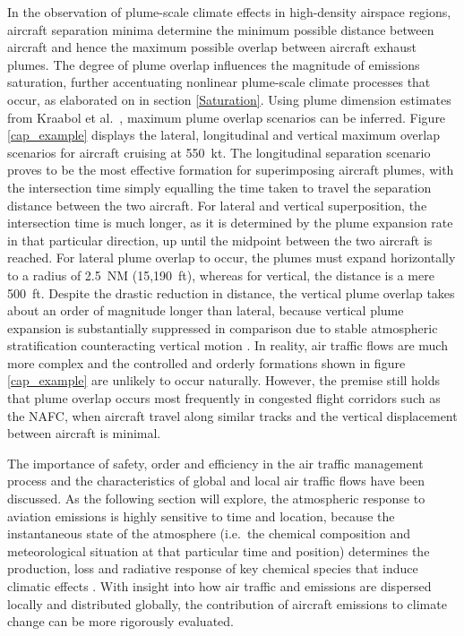 In the observation of plume-scale climate effects in high-density airspace regions, aircraft separation minima determine the minimum possible distance between aircraft and hence the maximum possible overlap between aircraft exhaust plumes. The degree of plume overlap influences the magnitude of emissions saturation, further accentuating nonlinear plume-scale climate processes that occur, as elaborated on in section \ref{Saturation}. Using plume dimension estimates from Kraabol et al.\ \cite{Kraabol2000a}, maximum plume overlap scenarios can be inferred. Figure \ref{cap_example} displays the lateral, longitudinal and vertical maximum overlap scenarios for aircraft cruising at 550~kt. The longitudinal separation scenario proves to be the most effective formation for superimposing aircraft plumes, with the intersection time simply equalling the time taken to travel the separation distance between the two aircraft. For lateral and vertical superposition, the intersection time is much longer, as it is determined by the plume expansion rate in that particular direction, up until the midpoint between the two aircraft is reached. For lateral plume overlap to occur, the plumes must expand horizontally to a radius of 2.5~NM (15,190~ft), whereas for vertical, the distance is a mere 500~ft. Despite the drastic reduction in distance, the vertical plume overlap takes about an order of magnitude longer than lateral, because vertical plume expansion is substantially suppressed in comparison due to stable atmospheric stratification counteracting vertical motion \cite{Schumann1995}. In reality, air traffic flows are much more complex and the controlled and orderly formations shown in figure \ref{cap_example} are unlikely to occur naturally. However, the premise still holds that plume overlap occurs most frequently in congested flight corridors such as the NAFC, when aircraft travel along similar tracks and the vertical displacement between aircraft is minimal. 

The importance of safety, order and efficiency in the air traffic management process and the characteristics of global and local air traffic flows have been discussed. As the following section will explore, the atmospheric response to aviation emissions is highly sensitive to time and location, because the instantaneous state of the atmosphere (i.e.\ the chemical composition and meteorological situation at that particular time and position) determines the production, loss and radiative response of key chemical species that induce climatic effects \cite{Jacobson2005}. With insight into how air traffic and emissions are dispersed locally and distributed globally, the contribution of aircraft emissions to climate change can be more rigorously evaluated.

